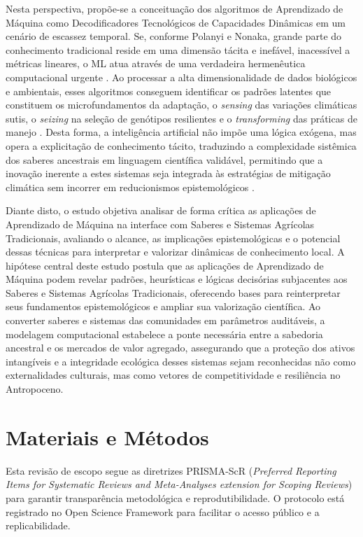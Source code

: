 Nesta perspectiva, propõe-se a conceituação dos algoritmos de Aprendizado de Máquina como Decodificadores Tecnológicos de Capacidades Dinâmicas em um cenário de escassez temporal. Se, conforme Polanyi e Nonaka, grande parte do conhecimento tradicional reside em uma dimensão tácita e inefável, inacessível a métricas lineares, o ML atua através de uma verdadeira hermenêutica computacional urgente  \cite{HosseiniyanKhatibi2024ML}. Ao processar a alta dimensionalidade de dados biológicos e ambientais, esses algoritmos conseguem identificar os padrões latentes que constituem os microfundamentos da adaptação, o \textit{sensing} das variações climáticas sutis, o \textit{seizing} na seleção de genótipos resilientes e o \textit{transforming} das práticas de manejo  \cite{Chen2024AIagrifoodSurvey}. Desta forma, a inteligência artificial não impõe uma lógica exógena, mas opera a explicitação de conhecimento tácito, traduzindo a complexidade sistêmica dos saberes ancestrais em linguagem científica validável, permitindo que a inovação inerente a estes sistemas seja integrada às estratégias de mitigação climática sem incorrer em reducionismos epistemológicos  \cite{Wheeler2021FarmerKnowledge}.

Diante disto, o estudo objetiva analisar de forma crítica as aplicações de Aprendizado de Máquina na interface com Saberes e Sistemas Agrícolas Tradicionais, avaliando o alcance, as implicações epistemológicas e o potencial dessas técnicas para interpretar e valorizar dinâmicas de conhecimento local. A hipótese central deste estudo postula que as aplicações de Aprendizado de Máquina podem revelar padrões, heurísticas e lógicas decisórias subjacentes aos Saberes e Sistemas Agrícolas Tradicionais, oferecendo bases para reinterpretar seus fundamentos epistemológicos e ampliar sua valorização científica. Ao converter saberes e sistemas das comunidades em parâmetros auditáveis, a modelagem computacional estabelece a ponte necessária entre a sabedoria ancestral e os mercados de valor agregado, assegurando que a proteção dos ativos intangíveis e a integridade ecológica desses sistemas sejam reconhecidas não como externalidades culturais, mas como vetores de competitividade e resiliência no Antropoceno.

\section{Materiais e Métodos}

Esta revisão de escopo segue as diretrizes PRISMA-ScR (\textit{Preferred Reporting Items for Systematic Reviews and Meta-Analyses extension for Scoping Reviews}) para garantir transparência metodológica e reprodutibilidade. O protocolo está registrado no Open Science Framework para facilitar o acesso público e a replicabilidade.

